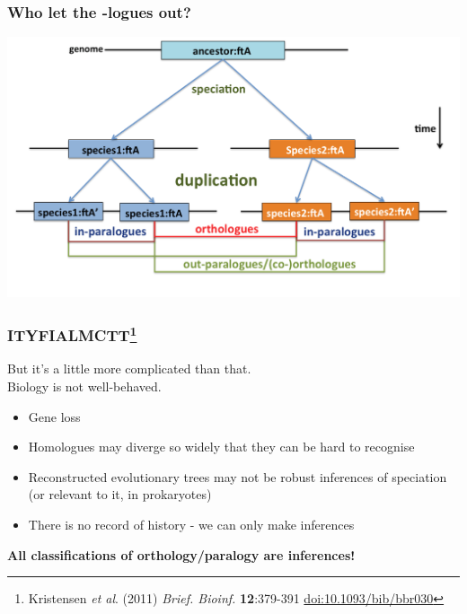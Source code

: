 \begin{frame}
  \frametitle{Who let the -logues out?}
  \begin{center}
    \includegraphics[width=1\textwidth]{images/logues5}  
  \end{center}  
\end{frame}

\begin{frame}
  \frametitle{ITYFIALMCTT\footnote{\tiny{Kristensen \textit{et al}. (2011) \textit{Brief. Bioinf.} \textbf{12}:379-391 \href{http://dx.doi.org/10.1093/bib/bbr030}{doi:10.1093/bib/bbr030}}}}
  But it's a little more complicated than that. \\
  Biology is not well-behaved.
  \begin{itemize}
    \item Gene loss
    \item Homologues may diverge so widely that they can be hard to recognise
    \item Reconstructed evolutionary trees may not be robust inferences of speciation (or relevant to it, in prokaryotes)
    \item There is no record of history - we can only make inferences
  \end{itemize}
  \textbf{All classifications of orthology/paralogy are inferences!}
\end{frame}

